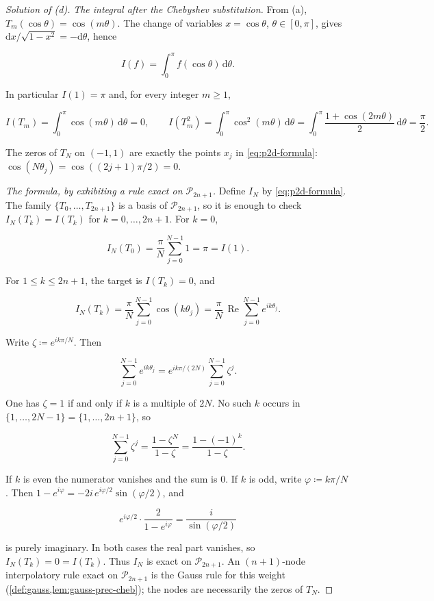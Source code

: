 \begin{proof}[Solution of (d)]
\emph{The integral after the Chebyshev substitution.}
From (a), \(T_{m}(\cos\theta)=\cos(m\theta)\). The change of variables \(x=\cos\theta\), \(\theta\in[0,\pi]\), gives \(\mathrm{d}x/\sqrt{1-x^{2}}=-\mathrm{d}\theta\), hence

\[
I(f)
=
\int_{0}^{\pi} f(\cos\theta)\,\mathrm{d}\theta.
\]

In particular \(I(1)=\pi\) and, for every integer \(m\ge 1\),

\[
I(T_{m})
=
\int_{0}^{\pi}\cos(m\theta)\,\mathrm{d}\theta
=
0,
\qquad
I(T_{m}^{2})
=
\int_{0}^{\pi}\cos^{2}(m\theta)\,\mathrm{d}\theta
=
\int_{0}^{\pi}\frac{1+\cos(2m\theta)}{2}\,\mathrm{d}\theta
=
\frac{\pi}{2}.
\]

The zeros of \(T_{N}\) on \((-1,1)\) are exactly the points \(x_{j}\) in \eqref{eq:p2d-formula}: \(\cos(N\theta_{j})=\cos((2j+1)\pi/2)=0\).

\emph{The formula, by exhibiting a rule exact on \(\mathcal{P}_{2n+1}\).}
Define \(I_{N}\) by \eqref{eq:p2d-formula}. The family \(\{T_{0},\ldots,T_{2n+1}\}\) is a basis of \(\mathcal{P}_{2n+1}\), so it is enough to check \(I_{N}(T_{k})=I(T_{k})\) for \(k=0,\ldots,2n+1\). For \(k=0\),

\[
I_{N}(T_{0})
=
\frac{\pi}{N}\sum_{j=0}^{N-1}1
=
\pi
=
I(1).
\]

For \(1\le k\le 2n+1\), the target is \(I(T_{k})=0\), and

\[
I_{N}(T_{k})
=
\frac{\pi}{N}
\sum_{j=0}^{N-1}
\cos(k\theta_{j})
=
\frac{\pi}{N}\,
\operatorname{Re}
\sum_{j=0}^{N-1}
e^{ik\theta_{j}}.
\]

Write \(\zeta\coloneqq e^{ik\pi/N}\). Then

\[
\sum_{j=0}^{N-1}e^{ik\theta_{j}}
=
e^{ik\pi/(2N)}
\sum_{j=0}^{N-1}\zeta^{j}.
\]

One has \(\zeta=1\) if and only if \(k\) is a multiple of \(2N\). No such \(k\) occurs in \(\{1,\ldots,2N-1\}=\{1,\ldots,2n+1\}\), so

\[
\sum_{j=0}^{N-1}\zeta^{j}
=
\frac{1-\zeta^{N}}{1-\zeta}
=
\frac{1-(-1)^{k}}{1-\zeta}.
\]

If \(k\) is even the numerator vanishes and the sum is \(0\). If \(k\) is odd, write \(\varphi\coloneqq k\pi/N\). Then \(1-e^{i\varphi}=-2i\,e^{i\varphi/2}\sin(\varphi/2)\), and

\[
e^{i\varphi/2}\cdot\frac{2}{1-e^{i\varphi}}
=
\frac{i}{\sin(\varphi/2)}
\]

is purely imaginary. In both cases the real part vanishes, so \(I_{N}(T_{k})=0=I(T_{k})\). Thus \(I_{N}\) is exact on \(\mathcal{P}_{2n+1}\). An \((n+1)\)-node interpolatory rule exact on \(\mathcal{P}_{2n+1}\) is the Gauss rule for this weight (\cref{def:gauss,lem:gauss-prec-cheb}); the nodes are necessarily the zeros of \(T_{N}\).


\end{proof}
